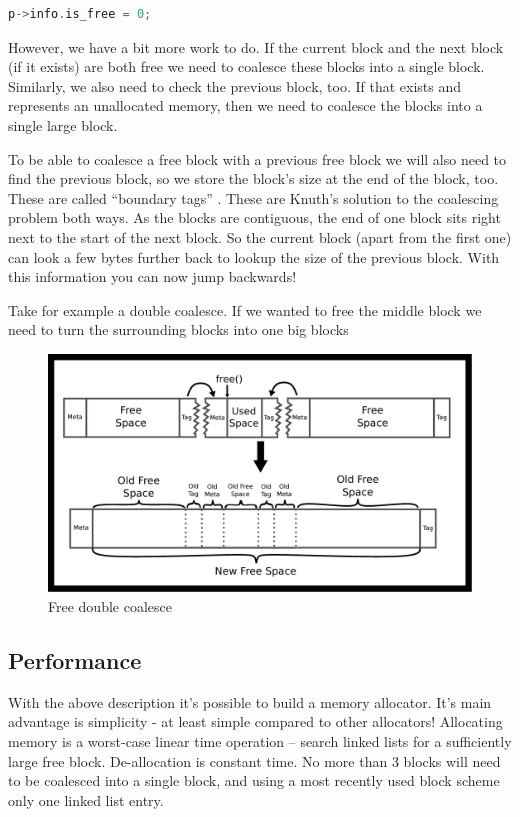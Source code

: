 \begin{lstlisting}[language=C]
p->info.is_free = 0;
\end{lstlisting}

However, we have a bit more work to do.
If the current block and the next block (if it exists) are both free we need to coalesce these blocks into a single block.
Similarly, we also need to check the previous block, too.
If that exists and represents an unallocated memory, then we need to coalesce the blocks into a single large block.

To be able to coalesce a free block with a previous free block we will also need to find the previous block, so we store the block's size at the end of the block, too.
These are called ``boundary tags'' \cite{knuth1973art}.
These are Knuth's solution to the coalescing problem both ways.
As the blocks are contiguous, the end of one block sits right next to the start of the next block.
So the current block (apart from the first one) can look a few bytes further back to lookup the size of the previous block.
With this information you can now jump backwards!

Take for example a double coalesce.
If we wanted to free the middle block we need to turn the surrounding blocks into one big blocks

\begin{figure}[H]
\centering
\includegraphics[width=.9\textwidth]{malloc/drawings/malloc_double_coalesce.eps}
\caption{Free double coalesce}
\end{figure}

\subsection{Performance}

With the above description it's possible to build a memory allocator.
It's main advantage is simplicity - at least simple compared to other allocators!
Allocating memory is a worst-case linear time operation -- search linked lists for a sufficiently large free block.
De-allocation is constant time.
No more than 3 blocks will need to be coalesced into a single block, and using a most recently used block scheme only one linked list entry.


